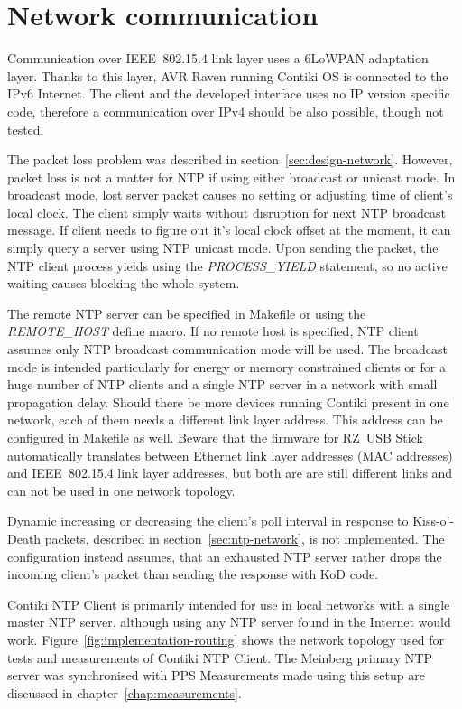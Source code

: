 
\section{Network communication}
Communication over IEEE~802.15.4 link layer uses a 6LoWPAN adaptation layer.
Thanks to this layer, AVR Raven running Contiki OS is connected to the IPv6 Internet.
The client and the developed interface uses no IP version specific code,
therefore a communication over IPv4 should be also possible, though not tested.

The packet loss problem was described in section~\ref{sec:design-network}.
However, packet loss is not a matter for NTP if using either broadcast or unicast mode.
In broadcast mode, lost server packet causes no setting or adjusting time of client's
local clock.
The client simply waits without disruption for next NTP broadcast message.
If client needs to figure out it's local clock offset at the moment,
it can simply query a server using NTP unicast mode.
Upon sending the packet, the NTP client process yields
using the {\it{PROCESS\_YIELD}} statement, so no active waiting
causes blocking the whole system.

The remote NTP server can be specified in Makefile or
using the {\it{REMOTE\_HOST}} define macro.
If no remote host is specified,
NTP client assumes only NTP broadcast communication mode will be used.
The broadcast mode is intended particularly for energy or memory constrained clients
or for a huge number of NTP clients and a single NTP server
in a network with small propagation delay.
Should there be more devices running Contiki present in one network,
each of them needs a different link layer address.
This address can be configured in Makefile as well.
Beware that the firmware for RZ~USB Stick automatically translates %
between Ethernet link layer addresses (MAC addresses) and IEEE~802.15.4 link layer
addresses, but both are are still different links and can not be used in one
network topology.

Dynamic increasing or decreasing the client's poll interval in response to
Kiss-o'-Death packets, described in section~\ref{sec:ntp-network}, is not implemented.
The configuration instead assumes, that an exhausted NTP server rather drops the incoming
client's packet than sending the response with KoD code.

Contiki NTP Client is primarily intended for use in local networks with a single master NTP server,
although using any NTP server found in the Internet would work.
Figure~\ref{fig:implementation-routing} shows the network topology used
for tests and measurements of Contiki NTP Client.
The Meinberg primary NTP server was synchronised with PPS %
Measurements made using this setup are discussed in chapter~\ref{chap:measurements}.


